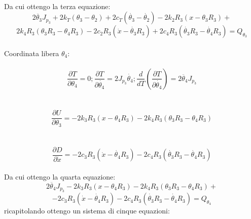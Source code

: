 \documentclass{article}
\begin{document}
\\
Da cui ottengo la terza equazione: 
\\
\begin{equation*}
 2\ddot{\theta_3}J_{p_3}+  2k_T(\theta_3 -  \theta_2) + 2c_T(\dot{\theta_3} - \dot{ \theta_2}) -2k_2R_3(x - \theta_3R_3) + 
\end{equation*}
\begin{equation*}
     2k_4R_3(\theta_3 R_3 - \theta_4 R_3)  -2c_2R_3(\dot{x} - \dot{\theta_3}R_3) +  2c_4R_3(\dot{\theta_3} R_3 - \dot{\theta_4} R_3) = Q_{\theta_3}
\end{equation*}
\\
Coordinata libera $\theta_4$:
\\
\\
\begin{equation*}
\frac{ \partial T}{\partial \theta_4} = 0 ; \frac{\partial T}{\partial \dot{\theta_4}} = 2J_{p_3}\dot{\theta_4};  \frac{d}{dT}(\frac{\partial T}{\partial \dot{\theta_4}})  = 2\ddot{\theta_4}J_{p_3}
\end{equation*}
\\
\\
\begin{equation*}
\frac{\partial U}{\partial \theta_3} = -2k_3R_3(x - \theta_4R_3) - 2k_4R_3(\theta_3 R_3 - \theta_4 R_3) 
\end{equation*}
\\
\\
\begin{equation*}
\frac{\partial D}{\partial \dot{x}} =  -2c_3R_3(\dot{x} - \dot{\theta_4}R_3) - 2c_4R_3(\dot{\theta_3} R_3 - \dot{\theta_4} R_3)
\end{equation*}
\\
Da cui ottengo la quarta equazione: 
\\
\begin{equation*}
 2\ddot{\theta_4}J_{p_3} -2k_3R_3(x - \theta_4R_3) - 2k_4R_3(\theta_3 R_3 - \theta_4 R_3) +
\end{equation*}
\begin{equation*}
-2c_3R_3(\dot{x} - \dot{\theta_4}R_3) - 2c_4R_3(\dot{\theta_3} R_3 - \dot{\theta_4} R_3)
      = Q_{\theta_4}
\end{equation*}
ricapitolando ottengo un sistema di cinque equazioni:
\end{document}
